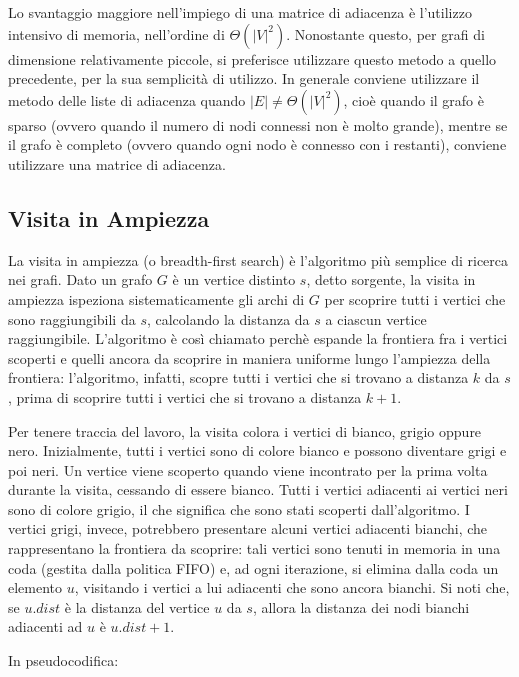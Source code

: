 Lo svantaggio maggiore nell'impiego di una matrice di adiacenza è l'utilizzo intensivo di memoria, nell'ordine di \(\Theta(|V|^2)\). Nonostante questo, per grafi di dimensione relativamente piccole, si preferisce utilizzare questo metodo a quello precedente, per la sua semplicità di utilizzo. In generale conviene utilizzare il metodo delle liste di adiacenza quando \(|E|\neq \Theta(|V|^2)\), cioè quando il grafo è sparso (ovvero quando il numero di nodi connessi non è molto grande), mentre se il grafo è completo (ovvero quando ogni nodo è connesso con i restanti), conviene utilizzare una matrice di adiacenza.

\subsection{Visita in Ampiezza}
La visita in ampiezza (o breadth-first search) è l'algoritmo più semplice di ricerca nei grafi. Dato un grafo \(G\) è un vertice distinto \(s\), detto sorgente, la visita in ampiezza ispeziona sistematicamente gli archi di \(G\) per scoprire tutti i vertici che sono raggiungibili da \(s\), calcolando la distanza da \(s\) a ciascun vertice raggiungibile. L'algoritmo è così chiamato perchè espande la frontiera fra i vertici scoperti e quelli ancora da scoprire in maniera uniforme lungo l'ampiezza della frontiera: l'algoritmo, infatti, scopre tutti i vertici che si trovano a distanza \(k\) da \(s\), prima di scoprire tutti i vertici che si trovano a distanza \(k+1\).

Per tenere traccia del lavoro, la visita colora i vertici di bianco, grigio oppure nero. Inizialmente, tutti i vertici sono di colore bianco e possono diventare grigi e poi neri. Un vertice viene scoperto quando viene incontrato per la prima volta durante la visita, cessando di essere bianco. Tutti i vertici adiacenti ai vertici neri sono di colore grigio, il che significa che sono stati scoperti dall'algoritmo. I vertici grigi, invece, potrebbero presentare alcuni vertici adiacenti bianchi, che rappresentano la frontiera da scoprire: tali vertici sono tenuti in memoria in una coda (gestita dalla politica FIFO) e, ad ogni iterazione, si elimina dalla coda un elemento \(u\), visitando i vertici a lui adiacenti che sono ancora bianchi. Si noti che, se \(u.dist\) è la distanza del vertice \(u\) da \(s\), allora la distanza dei nodi bianchi adiacenti ad \(u\) è \(u.dist+1\).

In pseudocodifica:


